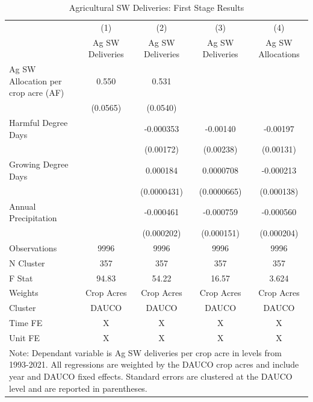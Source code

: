 \begin{table}[htbp]\centering
\caption{Agricultural SW Deliveries: First Stage Results}
\begin{tabular}{l*{4}{c}}
\hline\hline
                    &\multicolumn{1}{c}{(1)}&\multicolumn{1}{c}{(2)}&\multicolumn{1}{c}{(3)}&\multicolumn{1}{c}{(4)}\\
                    &\multicolumn{1}{c}{Ag SW Deliveries}&\multicolumn{1}{c}{Ag SW Deliveries}&\multicolumn{1}{c}{Ag SW Deliveries}&\multicolumn{1}{c}{Ag SW Allocations}\\
\hline
Ag SW Allocation per crop acre (AF)&       0.550&       0.531&            &            \\
                    &    (0.0565)&    (0.0540)&            &            \\
[1em]
Harmful Degree Days &            &   -0.000353&    -0.00140&    -0.00197\\
                    &            &   (0.00172)&   (0.00238)&   (0.00131)\\
[1em]
Growing Degree Days &            &    0.000184&   0.0000708&   -0.000213\\
                    &            & (0.0000431)& (0.0000665)&  (0.000138)\\
[1em]
Annual Precipitation&            &   -0.000461&   -0.000759&   -0.000560\\
                    &            &  (0.000202)&  (0.000151)&  (0.000204)\\
\hline
Observations        &        9996&        9996&        9996&        9996\\
N Cluster           &         357&         357&         357&         357\\
F Stat              &       94.83&       54.22&       16.57&       3.624\\
Weights             &  Crop Acres&  Crop Acres&  Crop Acres&  Crop Acres\\
Cluster             &       DAUCO&       DAUCO&       DAUCO&       DAUCO\\
Time FE             &           X&           X&           X&           X\\
Unit FE             &           X&           X&           X&           X\\
\hline\hline
\multicolumn{5}{l}{\footnotesize Note: Dependant variable is Ag SW deliveries per crop acre in levels from 1993-2021. All regressions are weighted by the DAUCO crop acres and include year and DAUCO fixed effects. Standard errors are clustered at the DAUCO level and are reported in parentheses.}\\
\end{tabular}
\end{table}
